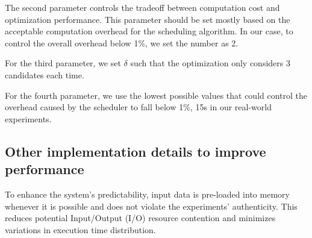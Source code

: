 The second parameter controls the tradeoff between computation cost and optimization performance.
This parameter should be set mostly based on the acceptable computation overhead for the scheduling algorithm.
In our case, to control the overall overhead below 1\%, we set the number as 2.

For the third parameter, we set $\delta$ such that the optimization only considers 3 candidates each time.

For the fourth parameter, we use the lowest possible values that could control the overhead caused by the scheduler to fall below 1$\%$, 15s in our real-world experiments.


\subsection{Other implementation details to improve performance}
To enhance the system's predictability, input data is pre-loaded into memory whenever it is possible and does not violate the experiments' authenticity.
This reduces potential Input/Output (I/O) resource contention and minimizes variations in execution time distribution.
